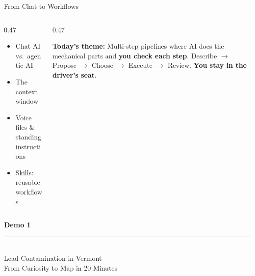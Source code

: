 \documentclass[aspectratio=169, 10pt]{beamer}
\begin{document}
\begin{frame}{From Chat to Workflows}
\begin{columns}[T]
\begin{column}{0.47\textwidth}
\begin{tcolorbox}[keybox, title={\faHistory\quad Session 1 Recap}]
\small
\begin{itemize}\setlength{\itemsep}{2pt}
  \item Chat AI vs.\ agentic AI
  \item The context window
  \item Voice files \& standing instructions
  \item Skills: reusable workflows
\end{itemize}
\end{tcolorbox}
\end{column}
\begin{column}{0.47\textwidth}
\begin{tcolorbox}[accentbox]
\small
\textbf{Today's theme:}
\vskip4pt
Multi-step pipelines where AI does the mechanical parts and \textbf{you check each step}.
\vskip4pt
Describe $\rightarrow$ Propose $\rightarrow$ Choose $\rightarrow$ Execute $\rightarrow$ Review.
\vskip4pt
\textbf{You stay in the driver's seat.}
\end{tcolorbox}
\end{column}
\end{columns}
\end{frame}

{
\begin{frame}
\centering\vfill
{\fontsize{22}{28}\bfseries\selectfont\color{white} Demo 1}\\[6pt]
{\color{UVMGold}\rule{5cm}{0.8pt}}\\[6pt]
{\normalsize\color{UVMGold} Lead Contamination in Vermont}\\[4pt]
{\small\color{PaleSage} From Curiosity to Map in 20 Minutes}
\vfill
\end{frame}
}
\end{document}
